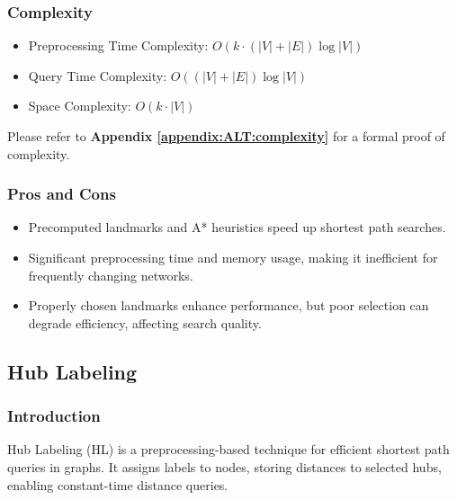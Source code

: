 		\subsubsection{Complexity}
				\begin{itemize}
					\item Preprocessing Time Complexity: $ O(k \cdot (|V| + |E|) \log |V|) $
					\item Query Time Complexity: $ O((|V| + |E|) \log |V|)$
					\item Space Complexity: $O(k \cdot |V|)$
				\end{itemize}
				Please refer to \textbf{Appendix \ref{appendix:ALT:complexity}} for a formal proof of complexity. \medskip
				
		\subsubsection{Pros and Cons}
		\begin{itemize}
			\item Precomputed landmarks and A* heuristics speed up shortest path searches.
			\item Significant preprocessing time and memory usage, making it inefficient for frequently changing networks.
			\item Properly chosen landmarks enhance performance, but poor selection can degrade efficiency, affecting search quality.
		\end{itemize}
	\subsection{Hub Labeling}
		\subsubsection{Introduction}
		Hub Labeling (HL) is a preprocessing-based technique for efficient shortest path queries in graphs. It assigns labels to nodes, storing distances to selected hubs, enabling constant-time distance queries.
		
